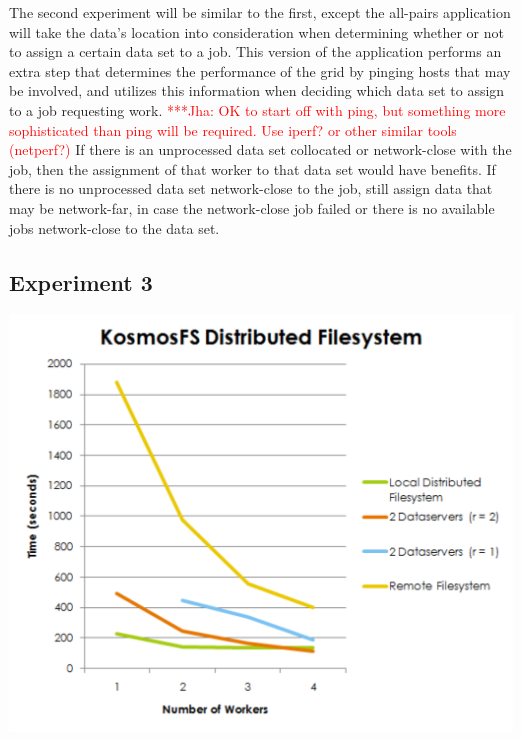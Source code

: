 \documentclass[a4paper,11pt]{article} \usepackage[utf8]{inputenc}
\newcommand{\jhanote}[1]{ {\textcolor{red} { ***Jha: #1 }}}
\newcommand{\yyenote}[1]{ {\textcolor{blue} { ***yye00: #1 }}} \else
\newcommand{\jhanote}[1]{} \newcommand{\yyenote}[1]{}
\begin{document}
The second experiment will be similar to the first, except the all-pairs
application will take the data's location into consideration when
determining whether or not to assign a certain data set to a job. This
version of the application performs an extra step that determines the
performance of the grid by pinging hosts that may be involved, and
utilizes this information when deciding which data set to assign to a
job requesting work.  \jhanote{OK to start off with ping, but something
more sophisticated than ping will be required. Use iperf? or other
similar tools (netperf?)}  If there is an unprocessed data set
collocated or network-close with the job, then the assignment of that
worker to that data set would have benefits.  If there is no unprocessed
data set network-close to the job, still assign data that may be
network-far, in case the network-close job failed or there is no
available jobs network-close to the data set.

\subsection{Experiment 3}

\includegraphics{KFSTest.pdf}
\end{document}
